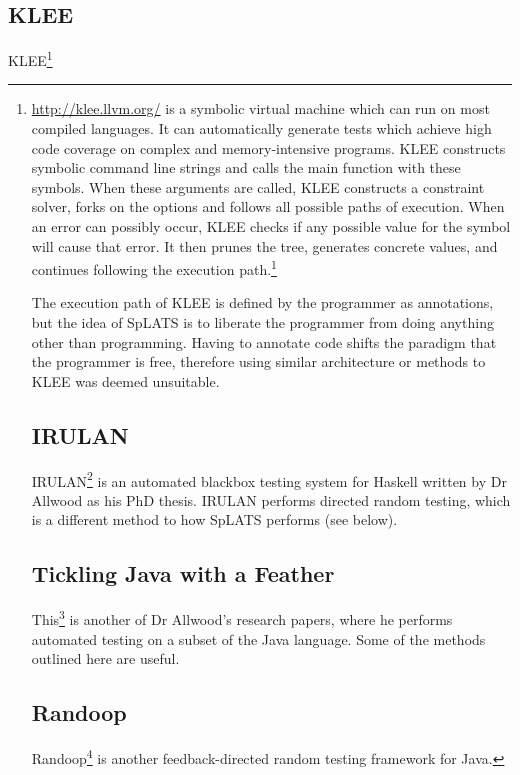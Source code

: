   \subsection{KLEE}
  KLEE\footnote{\url{http://klee.llvm.org/} is a symbolic virtual machine which can run on most compiled languages. It can automatically generate tests which achieve high code coverage on complex and memory-intensive programs. KLEE constructs symbolic command line strings and calls the main function with these symbols. When these arguments are called, KLEE constructs a constraint solver, forks on the options and follows all possible paths of execution. When an error can possibly occur, KLEE checks if any possible value for the symbol will cause that error. It then prunes the tree, generates concrete values, and continues following the execution path.\footnote{\url{http://www.usenix.org/event/osdi08/tech/full_papers/cadar/cadar_html/}}

  The execution path of KLEE is defined by the programmer as annotations, but the idea of SpLATS is to liberate the programmer from doing anything other than programming. Having to annotate code shifts the paradigm that the programmer is free, therefore using similar architecture or methods to KLEE was deemed unsuitable.

  \subsection{IRULAN}
    IRULAN\footnote{\url{http://www.doc.ic.ac.uk/~tora/thesis.pdf}} is an automated blackbox testing system for Haskell written by Dr Allwood as his PhD thesis.
    IRULAN performs directed random testing, which is a different method to how SpLATS performs (see below).

  \subsection{Tickling Java with a Feather}
    This\footnote{\url{http://pubs.doc.ic.ac.uk/testing-Java-with-fj/testing-Java-with-fj.pdf}} is another of Dr Allwood's research papers, where he performs automated testing on a subset of the Java language.
    Some of the methods outlined here are useful.

  \subsection{Randoop}
    Randoop\footnote{\url{http://code.google.com/p/randoop/}} is another
feedback-directed random testing framework for Java.

}
